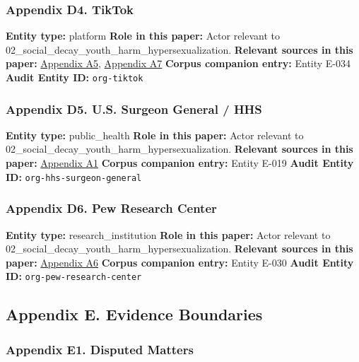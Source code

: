 \documentclass[
  american,
  11pt,
  letterpaper,
]{article}
\begin{document}
\subsubsection{Appendix D4. TikTok}\label{appendix-d4-tiktok}

\textbf{Entity type:} platform \textbf{Role in this paper:} Actor
relevant to 02\_social\_decay\_youth\_harm\_hypersexualization.
\textbf{Relevant sources in this paper:}
\hyperref[appendix-a5-when-kids-mode-isn-t-for-kids-investigating-tiktok-s-under-13-experience]{Appendix
A5},
\hyperref[appendix-a7-social-media-algorithms-amplifying-misogynistic-content]{Appendix
A7} \textbf{Corpus companion entry:} Entity E-034 \textbf{Audit Entity
ID:} \texttt{org-tiktok}

\subsubsection{Appendix D5. U.S. Surgeon General /
HHS}\label{appendix-d5-u-s-surgeon-general-hhs}

\textbf{Entity type:} public\_health \textbf{Role in this paper:} Actor
relevant to 02\_social\_decay\_youth\_harm\_hypersexualization.
\textbf{Relevant sources in this paper:}
\hyperref[appendix-a1-social-media-and-youth-mental-health-the-u-s-surgeon-general-s-advisory]{Appendix
A1} \textbf{Corpus companion entry:} Entity E-019 \textbf{Audit Entity
ID:} \texttt{org-hhs-surgeon-general}

\subsubsection{Appendix D6. Pew Research
Center}\label{appendix-d6-pew-research-center}

\textbf{Entity type:} research\_institution \textbf{Role in this paper:}
Actor relevant to 02\_social\_decay\_youth\_harm\_hypersexualization.
\textbf{Relevant sources in this paper:}
\hyperref[appendix-a6-social-media-seen-as-mostly-good-for-democracy-across-many-nations-but-u-s-is-a-major-outlier]{Appendix
A6} \textbf{Corpus companion entry:} Entity E-030 \textbf{Audit Entity
ID:} \texttt{org-pew-research-center}

\subsection{Appendix E. Evidence
Boundaries}\label{appendix-e.-evidence-boundaries}

\subsubsection{Appendix E1. Disputed
Matters}\label{appendix-e1-disputed-matters}
\end{document}
